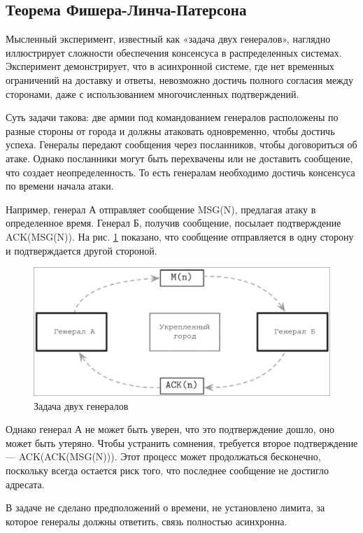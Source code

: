 \subsection{Теорема Фишера-Линча-Патерсона}

Мысленный эксперимент, известный как «задача двух генералов», наглядно
иллюстрирует сложности обеспечения консенсуса в распределенных системах.
Эксперимент демонстрирует, что в асинхронной системе, где нет временных
ограничений на доставку и ответы, невозможно достичь полного согласия между
сторонами, даже с использованием многочисленных подтверждений.

Суть задачи такова: две армии под командованием генералов расположены по разные
стороны от города и должны атаковать одновременно, чтобы достичь успеха.
Генералы передают сообщения через посланников, чтобы договориться об атаке.
Однако посланники могут быть перехвачены или не доставить сообщение, что
создает неопределенность. То есть генералам необходимо достичь консенсуса
по времени начала атаки.

Например, генерал А отправляет сообщение MSG(N), предлагая атаку в определенное
время. Генерал Б, получив сообщение, посылает подтверждение ACK(MSG(N)). На
рис. \ref{fig:generals} показано, что сообщение отправляется в одну сторону и
подтверждается  другой стороной.

\begin{figure}
  \centering
  \includegraphics[scale=0.4]{inc/generals.png}
  \caption{Задача двух генералов}
  \label{fig:generals}
\end{figure}

Однако генерал А не может быть уверен, что это подтверждение дошло, оно может
быть утеряно. Чтобы устранить сомнения, требуется второе подтверждение —
ACK(ACK(MSG(N))). Этот процесс может продолжаться бесконечно, поскольку всегда
остается риск того, что последнее сообщение не достигло адресата.

В задаче не сделано предположений о времени, не установлено лимита, за которое
генералы должны ответить, связь полностью асинхронна.

